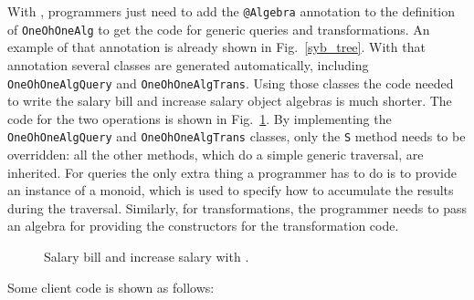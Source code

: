 With \Name, programmers just need to add the \lstinline{@Algebra} annotation
to the definition of \lstinline{OneOhOneAlg} to get the code for generic
queries and transformations. An example of that annotation is already
shown in Fig.~\ref{syb_tree}. With that annotation several classes
are generated automatically, including \lstinline{OneOhOneAlgQuery} and
\lstinline{OneOhOneAlgTrans}. Using those classes the code needed to write
the salary bill and increase salary object algebras is much
shorter. The code for the two operations is shown in
Fig.~\ref{query_with_oaframework}. By implementing the
\lstinline{OneOhOneAlgQuery} and \lstinline{OneOhOneAlgTrans} classes, only the
\lstinline{S} method needs to be overridden: all the other methods,
which do a simple generic traversal, are inherited. For queries the
only extra thing a programmer has to do is to provide an instance of a
monoid, which is used to specify how to accumulate the results during
the traversal. Similarly, for transformations, the programmer needs to
pass an algebra for providing the constructors for the transformation
code.

\begin{figure}[tb]
\vspace{-.1in}
\caption{Salary bill and increase salary with \Name.}
\label{query_with_oaframework}
\end{figure}

Some client code is shown as follows: %


